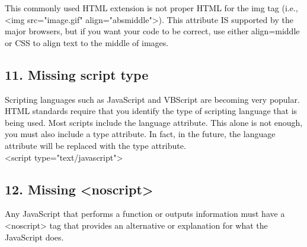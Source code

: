 \documentclass[12pt]{report}
\renewcommand{\_}{\kern-1.5pt\textunderscore\kern-1.5pt}
\begin{document}
\begin{adjustwidth}{0.2in}{0.84in}
\textcolor[HTML]{0D0D0D}{This commonly used HTML extension is not proper HTML for the img tag (i.e., <img src="image.gif" align="absmiddle">). This attribute IS supported by the major browsers, but if you want your code to be correct, use either align=middle or CSS to align text to the middle of images.}\par

\end{adjustwidth}


\vspace{\baselineskip}
\vspace{\baselineskip}
\vspace{\baselineskip}\begin{adjustwidth}{0.2in}{0.84in}
\subsection*{11. Missing script type}
\end{adjustwidth}

\begin{adjustwidth}{0.2in}{0.84in}
\textcolor[HTML]{0D0D0D}{Scripting languages such as JavaScript and VBScript are becoming very popular. HTML standards require that you identify the type of scripting language that is being used. Most scripts include the language attribute. This alone is not enough, you must also include a type attribute. In fact, in the future, the language attribute will be replaced with the type attribute.\\
<script type="text/javascript">}\par

\end{adjustwidth}

\begin{adjustwidth}{0.2in}{0.84in}
\subsection*{12. Missing <noscript>}
\end{adjustwidth}

\begin{adjustwidth}{0.2in}{0.84in}
\textcolor[HTML]{0D0D0D}{Any JavaScript that performs a function or outputs information must have a <noscript> tag that provides an alternative or explanation for what the JavaScript does.}\par

\end{adjustwidth}
\end{document}
